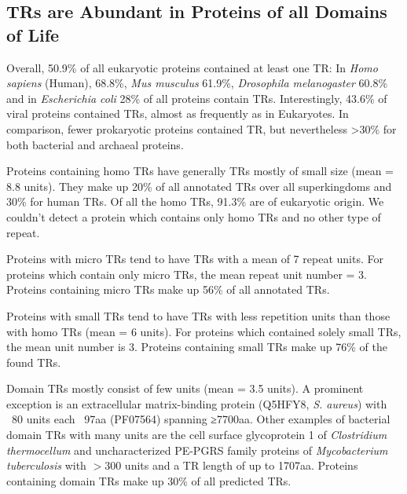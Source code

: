 \documentclass[a4,center,fleqn]{NAR}
\begin{document}
\subsection{TRs are Abundant in Proteins of all Domains of Life}
Overall, 50.9\% of all eukaryotic proteins contained at least one TR:
In \textit{Homo sapiens} (Human), 68.8\%, \textit{Mus musculus} 61.9\%, \textit{Drosophila melanogaster} 60.8\% and in  \textit{Escherichia coli} 28\% of all proteins contain TRs. 
Interestingly, 43.6\% of viral proteins contained TRs, almost as frequently as in Eukaryotes. In comparison, fewer prokaryotic proteins contained TR, but nevertheless >30\% for both bacterial and archaeal proteins. 

Proteins containing homo TRs have generally TRs mostly of small size (mean = 8.8 units). They make up 20\% of all annotated TRs over all superkingdoms and 30\% for human TRs. Of all the homo TRs, 91.3\% are of eukaryotic origin. We couldn't detect a protein which contains only homo TRs and no other type of repeat.

Proteins with micro TRs tend to have TRs with a mean of 7 repeat units. For proteins which contain only micro TRs, the mean repeat unit number = 3. 
Proteins containing micro TRs make up 56\% of all annotated TRs.

Proteins with small TRs tend to have TRs with less repetition units than those with homo TRs (mean = 6 units). For proteins which contained solely small TRs, the mean unit number is 3. 
Proteins containing small TRs make up 76\% of the found TRs.

Domain TRs mostly consist of few units (mean = 3.5 units). A prominent exception is an extracellular matrix-binding protein (Q5HFY8, \textit{S. aureus}) with ~80 units each ~97aa (PF07564) spanning ≥7700aa. Other examples of bacterial domain TRs with many units are the cell surface glycoprotein 1 of \textit{Clostridium thermocellum} and uncharacterized PE-PGRS family proteins of \textit{Mycobacterium tuberculosis} with $> 300$ units and a TR length of up to 1707aa. Proteins containing domain TRs make up 30\% of all predicted TRs.
\end{document}
